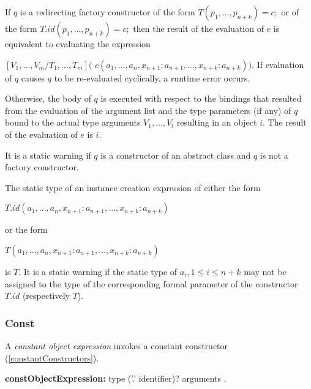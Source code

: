 \documentclass{article}
\newcommand{\code}[1]{{\sf #1}}
\begin{document}
\LMHash{}
If $q$ is a redirecting factory constructor of the form $T(p_1, \ldots, p_{n+k}) = c;$ or of the form  $T.id(p_1, \ldots, p_{n+k}) = c;$ then the result of the evaluation of $e$ is equivalent to evaluating the expression 

$[V_1,  \ldots, V_m/T_1,  \ldots, T_m]($\code{\NEW{} $c(a_1, \ldots, a_n, x_{n+1}: a_{n+1}, \ldots, x_{n+k}: a_{n+k}))$}.  If evaluation of $q$ causes $q$ to be re-evaluated cyclically, a runtime error occurs.


\LMHash{}
Otherwise, the body of $q$ is executed with respect to the bindings that resulted from the evaluation of the argument list and the type parameters (if any) of $q$ bound to the actual type arguments $V_1, \ldots, V_l$ resulting in an object $i$. The result of the evaluation of $e$ is $i$.

\LMHash{}
It is a static warning if $q$ is a constructor of an abstract class and $q$ is not a factory constructor.



\LMHash{}
The static type of an instance creation expression of either the form 

\NEW{} $T.id(a_1, \ldots , a_n, x_{n+1}: a_{n+1}, \ldots , x_{n+k}: a_{n+k})$ 

or the form 

\NEW{} $T(a_1, \ldots , a_n, x_{n+1}: a_{n+1}, \ldots , x_{n+k}: a_{n+k})$ 

is $T$.  
It is a static warning if the static type of $a_i, 1 \le i \le n+ k$ may not be assigned to the type of the corresponding formal parameter of the constructor $T.id$ (respectively $T$).



\subsubsection{ Const}

\LMHash{}
A {\em constant object expression} invokes a constant constructor (\ref{constantConstructors}). 

\begin{grammar}
{\bf constObjectExpression:}
\CONST{} type ('{\escapegrammar .}' identifier)? arguments
.
\end{grammar}
\end{document}
